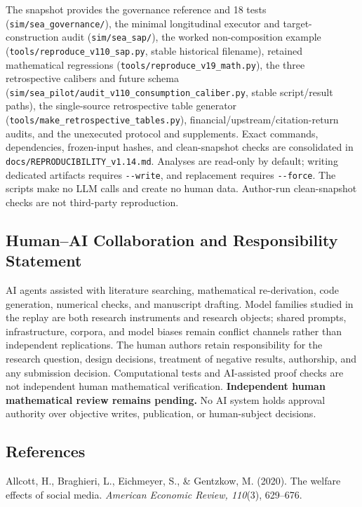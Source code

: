 \documentclass[
  11pt]{article}
\begin{document}
The snapshot provides the governance reference and 18 tests
(\texttt{sim/sea\_governance/}), the minimal longitudinal executor and
target-construction audit (\texttt{sim/sea\_sap/}), the worked
non-composition example (\texttt{tools/reproduce\_v110\_sap.py}, stable
historical filename), retained mathematical regressions
(\texttt{tools/reproduce\_v19\_math.py}), the three retrospective
calibers and future schema
(\texttt{sim/sea\_pilot/audit\_v110\_consumption\_caliber.py}, stable
script/result paths), the single-source retrospective table generator
(\texttt{tools/make\_retrospective\_tables.py}),
financial/upstream/citation-return audits, and the unexecuted protocol
and supplements. Exact commands, dependencies, frozen-input hashes, and
clean-snapshot checks are consolidated in
\texttt{docs/REPRODUCIBILITY\_v1.14.md}. Analyses are read-only by
default; writing dedicated artifacts requires \texttt{-\/-write}, and
replacement requires \texttt{-\/-force}. The scripts make no LLM calls
and create no human data. Author-run clean-snapshot checks are not
third-party reproduction.

\subsection{Human--AI Collaboration and Responsibility
Statement}\label{humanai-collaboration-and-responsibility-statement}

AI agents assisted with literature searching, mathematical
re-derivation, code generation, numerical checks, and manuscript
drafting. Model families studied in the replay are both research
instruments and research objects; shared prompts, infrastructure,
corpora, and model biases remain conflict channels rather than
independent replications. The human authors retain responsibility for
the research question, design decisions, treatment of negative results,
authorship, and any submission decision. Computational tests and
AI-assisted proof checks are not independent human mathematical
verification. \textbf{Independent human mathematical review remains
pending.} No AI system holds approval authority over objective writes,
publication, or human-subject decisions.

\subsection{References}\label{references}

\begingroup\footnotesize

Allcott, H., Braghieri, L., Eichmeyer, S., \& Gentzkow, M. (2020). The
welfare effects of social media. \emph{American Economic Review,
110}(3), 629--676.
\end{document}
